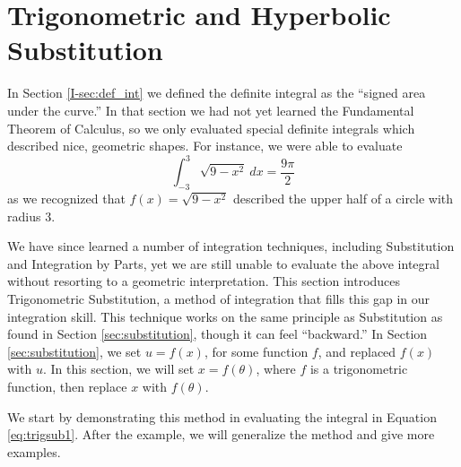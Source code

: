 \section{Trigonometric and Hyperbolic Substitution}\label{sec:trig_sub}

In Section \ref{I-sec:def_int} we defined the definite integral as the ``signed area under the curve.'' In that section we had not yet learned the Fundamental Theorem of Calculus, so we only evaluated special definite integrals which described nice, geometric shapes. For instance, we were able to evaluate
\begin{equation}
\int_{-3}^3\sqrt{9-x^2}\ dx = \frac{9\pi}{2}\label{eq:trigsub1}
\end{equation}
 as we recognized that $f(x) = \sqrt{9-x^2}$ described the upper half of a circle with radius 3. 

We have since learned a number of integration techniques, including Substitution and Integration by Parts, yet we are still unable to evaluate the above integral without resorting to a geometric interpretation. This section introduces Trigonometric Substitution, a method of integration that fills this gap in our integration skill. This technique works on the same principle as Substitution as found in Section \ref{sec:substitution}, though it can feel ``backward.'' In Section \ref{sec:substitution}, we set $u=f(x)$, for some function $f$, and replaced $f(x)$ with $u$. In this section, we will set $x=f(\theta)$, where $f$ is a trigonometric function, then replace $x$ with $f(\theta)$. 

We start by demonstrating this method in evaluating the integral in Equation \eqref{eq:trigsub1}. After the example, we will generalize the method and give more examples.\\
\enlargethispage{3\baselineskip}

